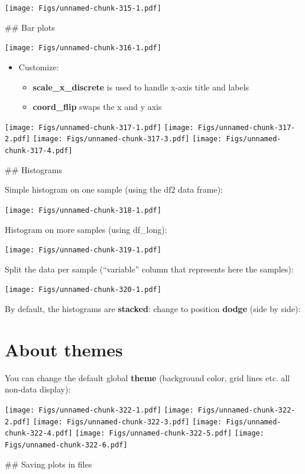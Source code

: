 \documentclass[]{book}
\providecommand{\tightlist}{%
  \setlength{\itemsep}{0pt}\setlength{\parskip}{0pt}}
\begin{document}
\texttt{[image: Figs/unnamed-chunk-315-1.pdf]}

\#\# Bar plots

\texttt{[image: Figs/unnamed-chunk-316-1.pdf]}

\begin{itemize}
\tightlist
\item
  Customize:

  \begin{itemize}
  \tightlist
  \item
    \textbf{scale\_x\_discrete} is used to handle x-axis title and labels
  \item
    \textbf{coord\_flip} swaps the x and y axis
  \end{itemize}
\end{itemize}

\texttt{[image: Figs/unnamed-chunk-317-1.pdf]} \texttt{[image: Figs/unnamed-chunk-317-2.pdf]} \texttt{[image: Figs/unnamed-chunk-317-3.pdf]} \texttt{[image: Figs/unnamed-chunk-317-4.pdf]}

\#\# Histograms

Simple histogram on one sample (using the df2 data frame):

\texttt{[image: Figs/unnamed-chunk-318-1.pdf]}

Histogram on more samples (using df\_long):

\texttt{[image: Figs/unnamed-chunk-319-1.pdf]}

Split the data per sample (``variable'' column that represents here the samples):

\texttt{[image: Figs/unnamed-chunk-320-1.pdf]}

By default, the histograms are \textbf{stacked}: change to position \textbf{dodge} (side by side):

\hypertarget{about-themes}{%
\section{About themes}\label{about-themes}}

You can change the default global \textbf{theme} (background color, grid lines etc. all non-data display):

\texttt{[image: Figs/unnamed-chunk-322-1.pdf]} \texttt{[image: Figs/unnamed-chunk-322-2.pdf]} \texttt{[image: Figs/unnamed-chunk-322-3.pdf]} \texttt{[image: Figs/unnamed-chunk-322-4.pdf]} \texttt{[image: Figs/unnamed-chunk-322-5.pdf]} \texttt{[image: Figs/unnamed-chunk-322-6.pdf]}

\#\# Saving plots in files
\end{document}
